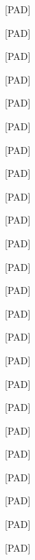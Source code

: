\documentclass[varwidth=150mm]{standalone}
\begin{document}
\begin{CJK*}{UTF8}{gbsn}
{{{\colorbox{red!0.0}{\strut [PAD]} \colorbox{red!0.0}{\strut [PAD]} \colorbox{red!0.0}{\strut [PAD]} \colorbox{red!0.0}{\strut [PAD]} \colorbox{red!0.0}{\strut [PAD]} \colorbox{red!0.0}{\strut [PAD]} \colorbox{red!0.0}{\strut [PAD]} \colorbox{red!0.0}{\strut [PAD]} \colorbox{red!0.0}{\strut [PAD]} \colorbox{red!0.0}{\strut [PAD]} \colorbox{red!0.0}{\strut [PAD]} \colorbox{red!0.0}{\strut [PAD]} \colorbox{red!0.0}{\strut [PAD]} \colorbox{red!0.0}{\strut [PAD]} \colorbox{red!0.0}{\strut [PAD]} \colorbox{red!0.0}{\strut [PAD]} \colorbox{red!0.0}{\strut [PAD]} \colorbox{red!0.0}{\strut [PAD]} \colorbox{red!0.0}{\strut [PAD]} \colorbox{red!0.0}{\strut [PAD]} \colorbox{red!0.0}{\strut [PAD]} \colorbox{red!0.0}{\strut [PAD]} \colorbox{red!0.0}{\strut [PAD]} \colorbox{red!0.0}{\strut [PAD]}
}}}
\end{CJK*}
\end{document}
